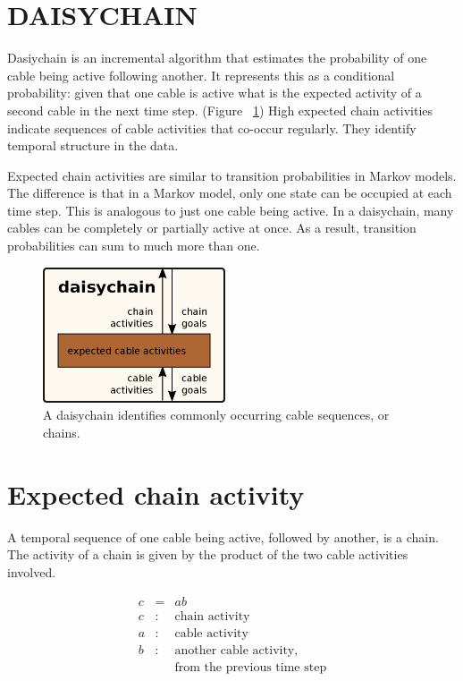 \documentclass[oneside,twocolumn]{article}
\begin{document}
\section*{\color{copper} DAISYCHAIN}

Dasiychain is an incremental algorithm that estimates the probability of one cable being active following another. It represents this as a conditional probability: given that one cable is active what is the expected activity of a second cable in the next time step. (Figure ~\ref{daisychain}) High expected chain activities indicate sequences of cable activities that co-occur regularly. They identify temporal structure in the data. 

Expected chain activities are similar to transition probabilities in Markov models. The difference is that in a Markov model, only one state can be occupied at each time step. This is analogous to just one cable being active. In a daisychain, many cables can be completely or partially active at once. As a result, transition probabilities can sum to much more than one. 

\begin{figure}[ht]
\centering
\includegraphics[height=4.0cm]{figs/daisychain.png}
\caption{A daisychain identifies commonly occurring cable sequences, or chains.}
\label{daisychain}
\end{figure}

\section*{\color{copper} Expected chain activity}

A temporal sequence of one cable being active, followed by another, is a chain. The activity of a chain is given by the product of the two cable activities involved.

\begin{eqnarray*}
c &= & ab\\ 
c &:& \mbox{chain activity} \\
a &:& \mbox{cable activity} \\
b &:& \mbox{another cable activity,}\\
&& \mbox{from the previous time step}\\
\end{eqnarray*}
\end{document}
